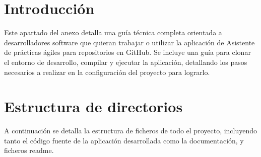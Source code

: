 
\section{Introducción}

Este apartado del anexo detalla una guía técnica completa orientada a desarrolladores software que quieran trabajar o utilizar la aplicación de Asistente de prácticas ágiles para repositorios en GitHub. Se incluye una guía para clonar el entorno de desarrollo, compilar y ejecutar la aplicación, detallando los pasos necesarios a realizar en la configuración del proyecto para lograrlo.

\section{Estructura de directorios}
A continuación se detalla la estructura de ficheros de todo el proyecto, incluyendo tanto el código fuente de la aplicación desarrollada como la documentación, y ficheros readme.
